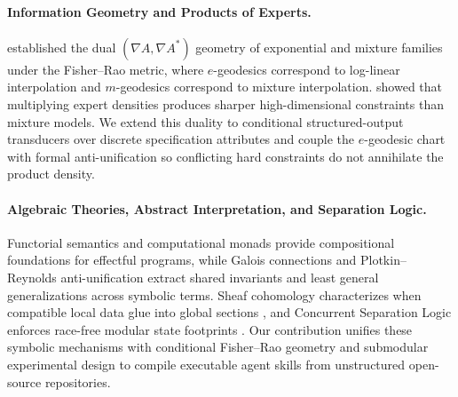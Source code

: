 \documentclass[11pt]{article}
\theoremstyle{definition}
\theoremstyle{plain}
\begin{document}
\paragraph{Information Geometry and Products of Experts.}
\citet{amari1985differential,amari2016information} established the dual $(\nabla A, \nabla A^*)$ geometry of exponential and mixture families under the Fisher--Rao metric, where $e$-geodesics correspond to log-linear interpolation and $m$-geodesics correspond to mixture interpolation. \citet{hinton2002training} showed that multiplying expert densities produces sharper high-dimensional constraints than mixture models. We extend this duality to conditional structured-output transducers over discrete specification attributes and couple the $e$-geodesic chart with formal anti-unification so conflicting hard constraints do not annihilate the product density.

\paragraph{Algebraic Theories, Abstract Interpretation, and Separation Logic.}
Functorial semantics \citep{lawvere1963functorial} and computational monads \citep{moggi1991notions} provide compositional foundations for effectful programs, while Galois connections \citep{cousot1977abstract} and Plotkin--Reynolds anti-unification \citep{plotkin1970note,reynolds1970transformational} extract shared invariants and least general generalizations across symbolic terms. Sheaf cohomology characterizes when compatible local data glue into global sections \citep{maclane1992sheaves}, and Concurrent Separation Logic enforces race-free modular state footprints \citep{reynolds2002separation,ohearn2007resources}. Our contribution unifies these symbolic mechanisms with conditional Fisher--Rao geometry and submodular experimental design \citep{nemhauser1978analysis} to compile executable agent skills from unstructured open-source repositories.
\end{document}
